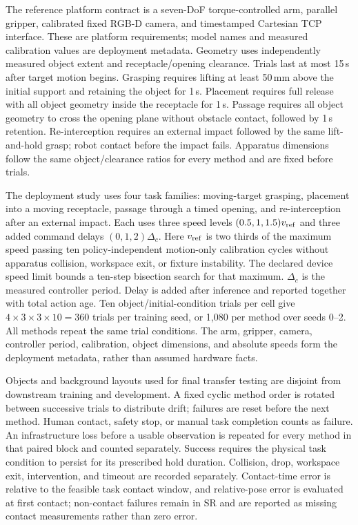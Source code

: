 The reference platform contract is a seven-DoF torque-controlled arm,
parallel gripper, calibrated fixed RGB-D camera, and timestamped Cartesian
TCP interface. These are platform requirements; model names and measured
calibration values are deployment metadata. Geometry uses independently
measured object extent and receptacle/opening clearance. Trials last at
most 15\,s after target motion begins. Grasping requires lifting at least
50\,mm above the initial support and retaining the object for 1\,s.
Placement requires full release with all object geometry inside the
receptacle for 1\,s. Passage requires all object geometry to cross the
opening plane without obstacle contact, followed by 1\,s retention.
Re-interception requires an external impact followed by the same lift-and-hold
grasp; robot contact before the impact fails. Apparatus dimensions follow
the same object/clearance ratios for every method and are fixed before trials.

The deployment study uses four task families: moving-target grasping,
placement into a moving receptacle, passage through a timed opening, and
re-interception after an external impact. Each uses three speed levels
$(0.5,1,1.5)v_{\rm ref}$ and three added command delays $(0,1,2)\Delta_c$.
Here $v_{\rm ref}$ is two thirds of the maximum speed passing ten
policy-independent motion-only calibration cycles without apparatus
collision, workspace exit, or fixture instability. The declared device
speed limit bounds a ten-step bisection search for that maximum.
$\Delta_c$ is the measured controller period.
Delay is added after inference and reported together with total action age.
Ten object/initial-condition trials per cell give
$4\times3\times3\times10=360$ trials per training seed, or 1,080 per method
over seeds 0--2. All methods repeat the same trial conditions. The arm,
gripper, camera, controller period, calibration, object dimensions, and
absolute speeds form the deployment metadata, rather than assumed hardware
facts.

Objects and background layouts used for final transfer testing are disjoint
from downstream training and development. A fixed cyclic method order is
rotated between successive trials to distribute drift; failures are reset
before the next method. Human contact, safety stop, or manual task completion
counts as failure. An infrastructure loss before a usable observation is
repeated for every method in that paired block and counted separately.
Success requires the physical task condition to persist for its prescribed
hold duration. Collision, drop, workspace exit, intervention, and timeout
are recorded separately. Contact-time error is relative to the feasible
task contact window, and relative-pose error is evaluated at first contact;
non-contact failures remain in SR and are reported as missing contact
measurements rather than zero error.

